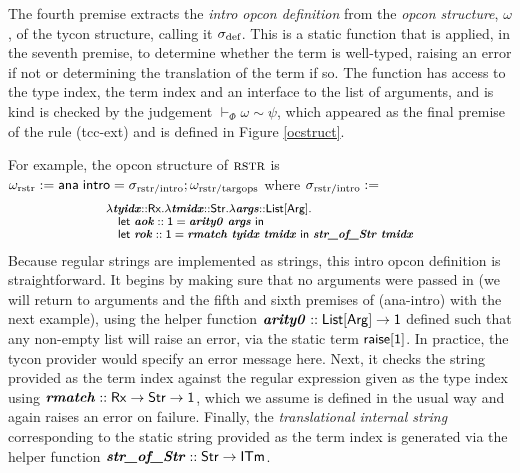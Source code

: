 \documentclass[10pt,preprint]{sigplanconf}
\begin{document}
The fourth premise extracts the \emph{intro opcon definition} from the \emph{opcon structure}, $\omega$, of the tycon structure, calling it $\sigma_\text{def}$. This is a static function that is applied, in the seventh premise, to determine whether the term is well-typed, raising an error if not or determining the translation of the term if so. The function has access to the type index, the term index and an interface to the list of arguments, and is kind is checked by the  judgement $\vdash_\Phi \omega \sim \psi$, which appeared as the final premise of the rule (tcc-ext) and is defined in Figure \ref{ocstruct}. 

For example, the opcon structure of $\textsc{rstr}$ is  $\small\omega_\text{rstr} := \tcstructn{\stx{rstr/intro}}; \omega_\text{rstr/targops}$ where $\small\stx{rstr/intro}:=$
\[\small\begin{array}{l}
    \slam{\krx}{\svar{tyidx}}{\slam{\kstr}{\svar{tmidx}}{\slam{\kargs}{\svar{args}}{\\
\quad \keyw{let}~\svar{aok} :: \kunit = \svar{arity0}~\svar{args}~\keyw{in}~\\
\quad \keyw{let}~\svar{rok} :: \kunit = \svar{rmatch}~\svar{tyidx}~\svar{tmidx}~\keyw{in}~\svar{str\_of\_Str}~\svar{tmidx}
}}}
\end{array}\]
Because regular strings are implemented as strings, this intro opcon definition is straightforward. It begins by making sure that no arguments were passed in (we will return to arguments and the fifth and sixth premises of (ana-intro) with the next example), using the helper function $\svar{arity0} :: \kargs \rightarrow \kunit$ defined such that any non-empty list will raise an error, via the static term ${\sf raise}[{\sf 1}]$. In practice, the tycon provider would specify an error message here. 
Next, it checks the string provided as the term index against the regular expression given as the type index using ${\textbf{\textit{rmatch}}} :: {\sf Rx} \rightarrow {\sf Str} \rightarrow {\sf 1}$, which we assume is defined in the usual way and again raises an error on failure. Finally, the \emph{translational internal string} corresponding to the static string provided as the term index is generated via the helper function $\svar{str\_of\_Str} :: \keyw{Str} \rightarrow \kitm$.%
\end{document}
